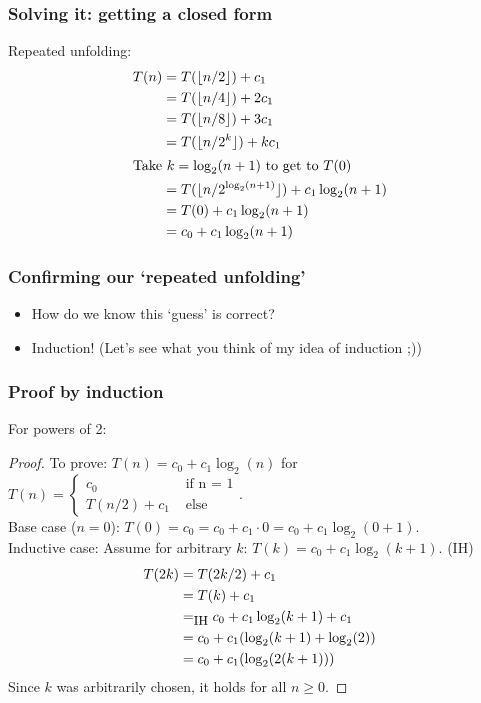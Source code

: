 \begin{frame}
	\frametitle{Solving it: getting a closed form}

	Repeated unfolding:
	\begin{align*}
		T(n) &= T(\lfloor n/2 \rfloor) + c_1\\
				 &= T(\lfloor n/4 \rfloor) + 2c_1\\
				 &= T(\lfloor n/8 \rfloor) + 3c_1\\
				 &= T(\lfloor n/2^k \rfloor) + kc_1\\
		\intertext{Take $k= \log_2(n+1)$ to get to $T(0)$}
		     &= T(\lfloor n/2^{\log_2(n+1)} \rfloor) + c_1\log_2(n+1)\\
				 &= T(0) + c_1\log_2(n+1)\\
				 &= c_0 + c_1\log_2(n+1)
	\end{align*}
\end{frame}

\begin{frame}
	\frametitle{Confirming our `repeated unfolding'}
				\begin{itemize}
					\item How do we know this `guess' is correct?	
					\item Induction! (Let's see what you think of my idea of induction ;))
	\end{itemize}
\end{frame}

\begin{frame}
	\frametitle{Proof by induction}

For powers of 2:

	\begin{proof}
		To prove: $T(n) = c_0 + c_1 \log_2(n)$ for $T(n)= \begin{cases}
			c_0 & \text{ if n = 1}\\
			T(n/2) + c_1 & \text{ else}
		\end{cases}$.	\\
		Base case ($n=0$): $T(0) = c_0 = c_0 + c_1 \cdot 0 = c_0 + c_1\log_2(0+1)$.\\
		Inductive case:
		Assume for arbitrary $k$: $T(k) = c_0 + c_1 \log_2(k+1)$. (IH)\\

		\begin{align*}
			T(2k) &= T(2k/2) + c_1\\
					 &= T(k) + c_1\\
					 &=_\text{\small IH} c_0 + c_1\log_2(k+1) + c_1\\
					 &= c_0 + c_1(\log_2(k+1) + \log_2(2))\\
					 &= c_0 + c_1(\log_2(2(k+1)))
		\end{align*}
		Since $k$ was arbitrarily chosen, it holds for all $n \geq 0$.
	\end{proof}
\end{frame}

